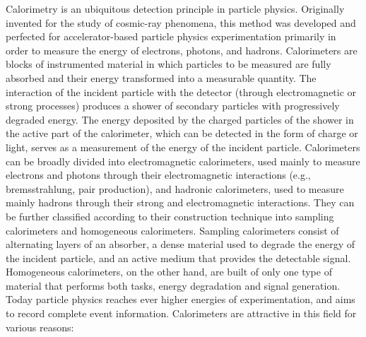 Calorimetry  is  an  ubiquitous  detection  principle  in particle  physics.
Originally  invented  for  the  study  of cosmic-ray phenomena, this method was developed and perfected  for  accelerator-based  particle  physics  experimentation  primarily  in  order  to  measure  the  energy  of electrons,   photons,   and   hadrons.
Calorimeters   are blocks of instrumented material in which particles to be measured  are  fully  absorbed  and  their  energy  transformed  into  a  measurable  quantity.
The  interaction  of the incident particle with the detector (through electromagnetic or strong processes) produces a shower of secondary  particles  with  progressively  degraded  energy.
The  energy  deposited  by  the  charged  particles  of  the shower  in  the  active  part  of  the  calorimeter,  which  can be  detected  in  the  form  of  charge  or  light,  serves  as  a measurement of the energy of the incident particle.
Calorimeters can be broadly divided into electromagnetic calorimeters, used mainly to measure electrons and photons through their electromagnetic interactions (e.g., bremsstrahlung, pair production), and hadronic calorimeters,  used  to  measure  mainly  hadrons  through  their strong  and  electromagnetic  interactions.
They  can  be further  classified  according  to  their  construction  technique   into   sampling   calorimeters   and   homogeneous calorimeters.
Sampling  calorimeters  consist  of  alternating  layers  of  an  absorber,  a  dense  material  used  to  degrade the energy of the incident particle, and an active medium  that  provides  the  detectable  signal.
Homogeneous calorimeters, on the other hand, are built of only one  type  of  material  that  performs  both  tasks,  energy degradation and signal generation.
Today particle physics reaches ever higher energies of experimentation, and aims to record complete event information.
Calorimeters  are  attractive  in  this  field  for various reasons:
